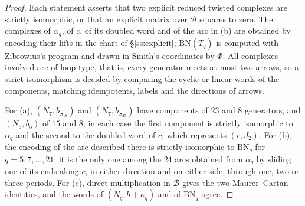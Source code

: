 \begin{proof}
Each statement asserts that two explicit reduced twisted complexes are strictly isomorphic, or that
an explicit matrix over $\mathcal B$ squares to zero.  The complexes
of $\alpha_q$, of $c$, of its doubled word and of the arc in (b) are obtained by encoding their lifts
in the chart of \S\ref{ss:explicit}; $\widetilde{\mathrm{BN}}(T_q)$ is computed with Zibrowius's
program \cite{Zibkht} and drawn in Smith's coordinates by $\Phi$.  All complexes involved are of loop
type, that is, every generator meets at most two arrows, so a strict isomorphism is decided by
comparing the cyclic or linear words of the components, matching idempotents, labels and the
directions of arrows.

For (a), $(N_7,b_{S_{18}})$ and $(N_7,b_{S_{25}})$ have components of $23$ and $8$ generators, and
$(N_5,b_5)$ of $15$ and $8$; in each case the first component is strictly isomorphic to $\alpha_q$
and the second to the doubled word of $c$, which represents $(c,J_2)$.  For (b), the encoding of the
arc described there is strictly isomorphic to $\mathrm{BN}_q$ for $q=5,7,\dots,21$; it is the only
one among the $24$ arcs obtained from $\alpha_q$ by sliding one of its ends along $c$, in either
direction and on either side, through one, two or three periods.  For (c), direct multiplication in
$\mathcal B$ gives the two Maurer--Cartan identities, and the words of $(N_q,b+\kappa_q)$ and of
$\mathrm{BN}_q$ agree.
\end{proof}

